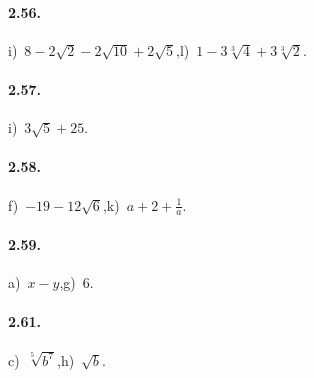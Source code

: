 \paragraph{2.56.}
i)~$8-2\sqrt 2-2\sqrt{10}+2\sqrt 5$,\quad l)~$1-3\sqrt[3]4+3\sqrt[3]2$.

\paragraph{2.57.}
i)~$3\sqrt 5+25$.

\paragraph{2.58.}
f)~$-19-12\sqrt 6$,\quad k)~$a+2+\frac 1 a$.

\paragraph{2.59.}
a)~$x-y$,\quad g)~$6$.


\paragraph{2.61.}
c)~$\sqrt[5]{b^7}$,\quad h)~$\sqrt b$.

